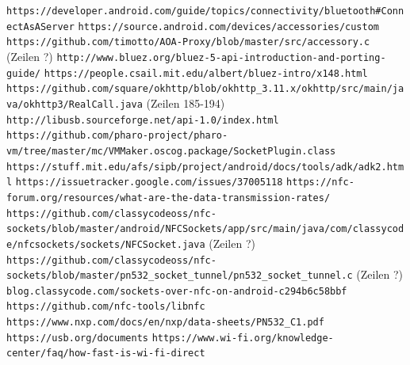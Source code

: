     \renewcommand\refname{Internetquellen}
    \begin{thebibliography}{9}
        \texttt{https://developer.android.com/guide/topics/\linebreak connectivity/bluetooth\#ConnectAsAServer}
        \texttt{https://source.android.com/devices/\linebreak accessories/custom}
        \texttt{https://github.com/timotto/AOA-Proxy/blob/\linebreak master/src/accessory.c} (Zeilen ?)
        \texttt{http://www.bluez.org/bluez-5-api-introduction-and-\linebreak porting-guide/}
        \texttt{https://people.csail.mit.edu/albert/bluez-intro/x148.html}
        \texttt{https://github.com/square/okhttp/blob/okhttp\_3.11.x/\linebreak okhttp/src/main/java/okhttp3/RealCall.java} (Zeilen 185-194)
        \texttt{http://libusb.sourceforge.net/api-1.0/index.html}
        \texttt{https://github.com/pharo-project/pharo-vm/tree/\linebreak master/mc/VMMaker.oscog.package/SocketPlugin.class}
        \texttt{https://stuff.mit.edu/afs/sipb/project/android/docs/tools/\linebreak adk/adk2.html}
        \texttt{https://issuetracker.google.com/issues/37005118}
        \texttt{https://nfc-forum.org/resources/what-are-the-data-\linebreak transmission-rates/}
        \texttt{https://github.com/classycodeoss/nfc-sockets/blob/\linebreak master/android/NFCSockets/app/src/main/java/com/classycode/\linebreak nfcsockets/sockets/NFCSocket.java} (Zeilen ?)
        \texttt{https://github.com/classycodeoss/nfc-sockets/blob/\linebreak master/pn532\_socket\_tunnel/pn532\_socket\_tunnel.c} (Zeilen ?)
        \texttt{blog.classycode.com/sockets-over-nfc-on-\linebreak android-c294b6c58bbf}
        \texttt{https://github.com/nfc-tools/libnfc}
        \texttt{https://www.nxp.com/docs/en/nxp/data-sheets/\linebreak PN532\_C1.pdf}
        \texttt{https://usb.org/documents}
        \texttt{https://www.wi-fi.org/knowledge-center/faq/\linebreak how-fast-is-wi-fi-direct}
    \end{thebibliography}
